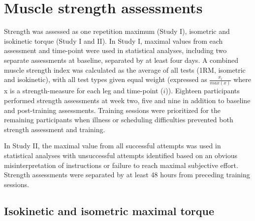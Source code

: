 \documentclass[twoside,10pt]{gihclass} %
\begin{document}
\hypertarget{muscle-strength-assessments}{%
\section{Muscle strength assessments}\label{muscle-strength-assessments}}

Strength was assessed as one repetition maximum (Study I), isometric and isokinetic torque (Study I and II). In Study I, maximal values from each assessment and time-point were used in statistical analyses, including two separate assessments at baseline, separated by at least four days. A combined muscle strength index was calculated as the average of all tests (1RM, isometric and isokinetic), with all test types given equal weight (expressed as \(\frac{x_i}{max(x)}\) where x is a strength-measure for each leg and time-point (\(i\))). Eighteen participants performed strength assessments at week two, five and nine in addition to baseline and post-training assessments. Training sessions were prioritized for the remaining participants when illness or scheduling difficulties prevented both strength assessment and training.

In Study II, the maximal value from all successful attempts was used in statistical analyses with unsuccessful attempts identified based on an obvious misinterpretation of instructions or failure to reach maximal subjective effort. Strength assessments were separated by at least 48 hours from preceding training sessions.

\hypertarget{isokinetic-and-isometric-maximal-torque}{%
\subsection{Isokinetic and isometric maximal torque}\label{isokinetic-and-isometric-maximal-torque}}
\end{document}
